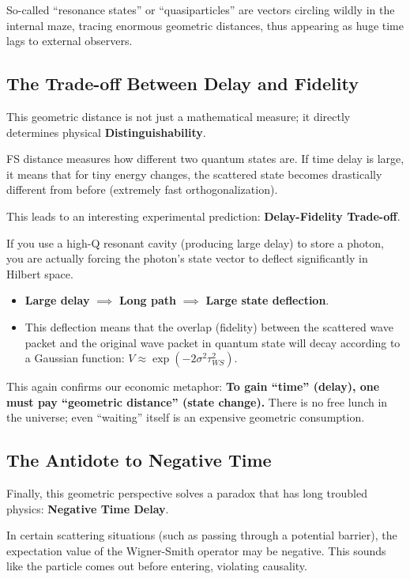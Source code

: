So-called ``resonance states'' or ``quasiparticles'' are vectors circling wildly in the internal maze, tracing enormous geometric distances, thus appearing as huge time lags to external observers.

\subsection{The Trade-off Between Delay and Fidelity}

This geometric distance is not just a mathematical measure; it directly determines physical \textbf{Distinguishability}.

FS distance measures how different two quantum states are. If time delay is large, it means that for tiny energy changes, the scattered state becomes drastically different from before (extremely fast orthogonalization).

This leads to an interesting experimental prediction: \textbf{Delay-Fidelity Trade-off}.

If you use a high-Q resonant cavity (producing large delay) to store a photon, you are actually forcing the photon's state vector to deflect significantly in Hilbert space.

\begin{itemize}
\item \textbf{Large delay} $\implies$ \textbf{Long path} $\implies$ \textbf{Large state deflection}.

\item This deflection means that the overlap (fidelity) between the scattered wave packet and the original wave packet in quantum state will decay according to a Gaussian function: $V \approx \exp(-2\sigma^2 \tau_{WS}^2)$.
\end{itemize}

This again confirms our economic metaphor: \textbf{To gain ``time'' (delay), one must pay ``geometric distance'' (state change).} There is no free lunch in the universe; even ``waiting'' itself is an expensive geometric consumption.

\subsection{The Antidote to Negative Time}

Finally, this geometric perspective solves a paradox that has long troubled physics: \textbf{Negative Time Delay}.

In certain scattering situations (such as passing through a potential barrier), the expectation value of the Wigner-Smith operator may be negative. This sounds like the particle comes out before entering, violating causality.

